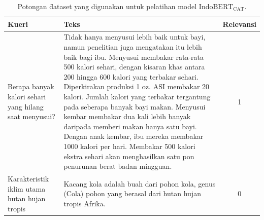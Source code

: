 \begin{table}[!ht]
    \centering
    \caption{Potongan \f{dataset} yang digunakan untuk pelatihan model $\text{IndoBERT}_{\text{CAT}}$.}
    \label{tab:contoh-indobert-cat-data}
    \begin{tabular}{|p{3cm}|p{10cm}|c|} \hline
        \textbf{Kueri}                                         & \textbf{Teks}                                                  & \textbf{Relevansi} \\ \hline
        Berapa banyak kalori sehari yang hilang saat menyusui? & Tidak hanya menyusui lebih baik untuk bayi, namun penelitian juga mengatakan itu lebih baik bagi ibu. Menyusui membakar rata-rata 500 kalori sehari, dengan kisaran khas antara 200 hingga 600 kalori yang terbakar sehari. Diperkirakan produksi 1 oz. ASI membakar 20 kalori. Jumlah kalori yang terbakar tergantung pada seberapa banyak bayi makan. Menyusui kembar membakar dua kali lebih banyak daripada memberi makan hanya satu bayi. Dengan anak kembar, ibu mereka membakar 1000 kalori per hari. Membakar 500 kalori ekstra sehari akan menghasilkan satu pon penurunan berat badan mingguan. & 1                  \\ \hline
        Karakteristik iklim utama hutan hujan tropis           & Kacang kola adalah buah dari pohon kola, genus (Cola) pohon yang berasal dari hutan hujan tropis Afrika. & 0                  \\ \hline
    \end{tabular}
\end{table}


